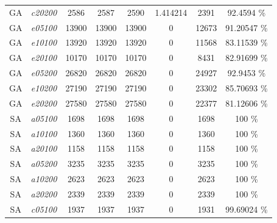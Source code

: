 \documentclass[portugues, brazil, a4paper,12pt]{article}
\begin{document}
{\begin{longtable}{cc|cccc|cc}
			GA                 & \textit{c20200}  & 2586      & 2587           & 2590         & 1.414214               &  2391                           & 92.4594 \% \\
			GA                 & \textit{e05100}  & 13900     & 13900          & 13900        & 0                      &   12673                         & 91.20547 \% \\
			GA                 & \textit{e10100}  & 13920     & 13920          & 13920        & 0                      &   11568                         & 83.11539 \% \\
			GA                 & \textit{e20100}  & 10170     & 10170          & 10170        & 0                      &   8431                          & 82.91699 \% \\
			GA                 & \textit{e05200}  & 26820     & 26820          & 26820        & 0                      &   24927                         & 92.9453 \% \\
			GA                 & \textit{e10200}  & 27190     & 27190          & 27190        & 0                      &   23302                         & 85.70693 \% \\
			GA                 & \textit{e20200}  & 27580     & 27580          & 27580        & 0                      &   22377                         & 81.12606 \% \\ \hline
			SA                 & \textit{a05100}  & 1698      & 1698           & 1698         & 0                      & 1698                            & 100 \% \\
			SA                 & \textit{a10100}  & 1360      & 1360           & 1360         & 0                      & 1360                            & 100 \% \\
			SA                 & \textit{a20100}  & 1158      & 1158           & 1158         & 0                      & 1158                            & 100 \% \\
			SA                 & \textit{a05200}  & 3235      & 3235           & 3235         & 0                      & 3235                            & 100 \% \\
			SA                 & \textit{a10200}  & 2623      & 2623           & 2623         & 0                      & 2623                            & 100 \% \\
			SA                 & \textit{a20200}  & 2339      & 2339           & 2339         & 0                      & 2339                            & 100 \% \\
			SA                 & \textit{c05100}  & 1937      & 1937           & 1937         & 0                      &  1931                           & 99.69024 \% \\

\end{longtable}}
\end{document}
